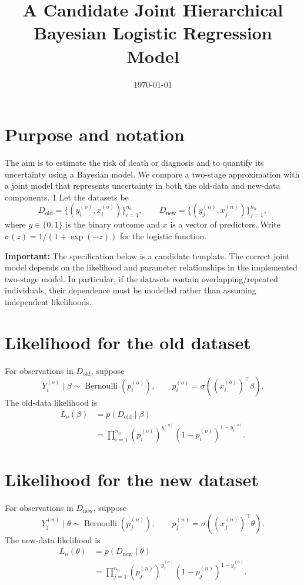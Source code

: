 \documentclass[11pt,a4paper]{article}
\title{A Candidate Joint Hierarchical Bayesian Logistic Regression Model}
\author{}
\date{\today}
\begin{document}
\maketitle

\section{Purpose and notation}

The aim is to estimate the risk of death or diagnosis and to quantify its uncertainty using a Bayesian model. We compare a two-stage approximation with a joint model that represents uncertainty in both the old-data and new-data components.
1
Let the datasets be
\[
D_{\mathrm{old}}=\{(y_i^{(o)},x_i^{(o)})\}_{i=1}^{n_o},
\qquad
D_{\mathrm{new}}=\{(y_j^{(n)},x_j^{(n)})\}_{j=1}^{n_n},
\]
where $y\in\{0,1\}$ is the binary outcome and $x$ is a vector of predictors. Write $\sigma(z)=1/(1+\exp(-z))$ for the logistic function.

\textbf{Important:} The specification below is a candidate template. The correct joint model depends on the likelihood and parameter relationships in the implemented two-stage model. In particular, if the datasets contain overlapping/repeated individuals, their dependence must be modelled rather than assuming independent likelihoods.

\section{Likelihood for the old dataset}

For observations in $D_{\mathrm{old}}$, suppose
\[
Y_i^{(o)}\mid \beta \sim \operatorname{Bernoulli}(p_i^{(o)}),
\qquad
p_i^{(o)}=\sigma\!\left((x_i^{(o)})^\top\beta\right).
\]
The old-data likelihood is
\begin{align}
L_o(\beta)
&=p(D_{\mathrm{old}}\mid\beta)\\
&=\prod_{i=1}^{n_o}
\left(p_i^{(o)}\right)^{y_i^{(o)}}
\left(1-p_i^{(o)}\right)^{1-y_i^{(o)}}.
\end{align}

\section{Likelihood for the new dataset}

For observations in $D_{\mathrm{new}}$, suppose
\[
Y_j^{(n)}\mid \theta \sim \operatorname{Bernoulli}(p_j^{(n)}),
\qquad
p_j^{(n)}=\sigma\!\left((x_j^{(n)})^\top\theta\right).
\]
The new-data likelihood is
\begin{align}
L_n(\theta)
&=p(D_{\mathrm{new}}\mid\theta)\\
&=\prod_{j=1}^{n_n}
\left(p_j^{(n)}\right)^{y_j^{(n)}}
\left(1-p_j^{(n)}\right)^{1-y_j^{(n)}}.
\end{align}
\end{document}
